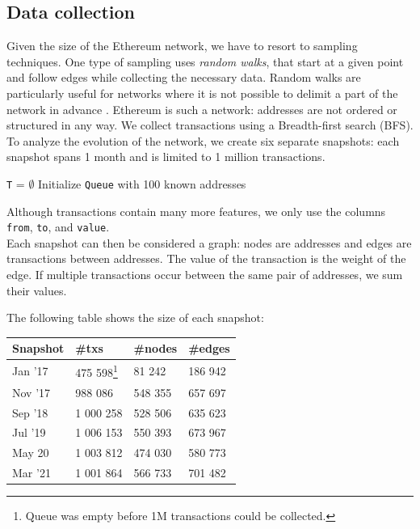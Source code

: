 \documentclass[10pt,a4paper]{article}
\begin{document}
\begin{multicols}{2}
\section{Data collection}
Given the size of the Ethereum network, we have to resort to sampling techniques. One type of sampling uses \textit{random walks}, that start at a given point and follow edges while collecting the necessary data. Random walks are particularly useful for networks where it is not possible to delimit a part of the network in advance \cite{Becchetti06acomparison}. Ethereum is such a network: addresses are not ordered or structured in any way. We collect transactions using a Breadth-first search (BFS). To analyze the evolution of the network, we create six separate snapshots: each snapshot spans 1 month and is limited to 1 million transactions.

\medskip
\begin{algorithm}[H]
\SetAlgoLined
\hspace{5pt}\texttt{T} = $\emptyset$\newline
Initialize \texttt{Queue} with 100 known addresses
\end{algorithm}

Although transactions contain many more features, we only use the columns \texttt{from}, \texttt{to}, and \texttt{value}.\\
Each snapshot can then be considered a graph: nodes are addresses and edges are transactions between addresses. The value of the transaction is the weight of the edge. If multiple transactions occur between the same pair of addresses, we sum their values.

The following table shows the size of each snapshot:\\
\vspace{5pt}
\bgroup
\def\arraystretch{1.5}
\begin{tabular}{p{}|p{}|p{}|p{}}
\textbf{Snapshot} & \textbf{\#txs} & \textbf{\#nodes} & \textbf{\#edges} \\ 
\hline 
Jan '17 & 475 598\footnote{Queue was empty before 1M transactions could be collected.}& 81 242 & 186 942  \\
Nov '17 & 988 086 & 548 355 & 657 697  \\
Sep '18 & 1 000 258 & 528 506 & 635 623 \\
Jul '19 & 1 006 153 & 550 393 & 673 967 \\
May 20 & 1 003 812 & 474 030 & 580 773 \\
Mar '21 & 1 001 864 & 566 733 & 701 482 \\
\end{tabular}
\egroup


\end{multicols}
\end{document}

